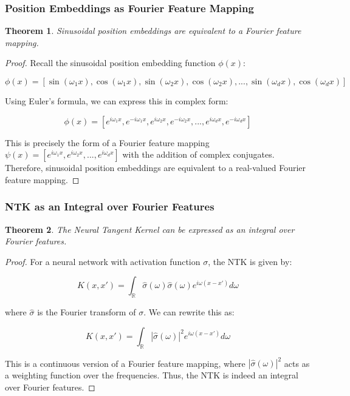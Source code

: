 \documentclass{article}
\newtheorem{theorem}{Theorem}
\begin{document}
\subsubsection{Position Embeddings as Fourier Feature Mapping}

\begin{theorem}
Sinusoidal position embeddings are equivalent to a Fourier feature mapping.
\end{theorem}

\begin{proof}
Recall the sinusoidal position embedding function $\phi(x)$:

\begin{equation}
    \phi(x) = [\sin(\omega_1 x), \cos(\omega_1 x), \sin(\omega_2 x), \cos(\omega_2 x), ..., \sin(\omega_d x), \cos(\omega_d x)]
\end{equation}

Using Euler's formula, we can express this in complex form:

\begin{equation}
    \phi(x) = [e^{i\omega_1 x}, e^{-i\omega_1 x}, e^{i\omega_2 x}, e^{-i\omega_2 x}, ..., e^{i\omega_d x}, e^{-i\omega_d x}]
\end{equation}

This is precisely the form of a Fourier feature mapping $\psi(x) = [e^{i\omega_1 x}, e^{i\omega_2 x}, ..., e^{i\omega_d x}]$ with the addition of complex conjugates. Therefore, sinusoidal position embeddings are equivalent to a real-valued Fourier feature mapping.
\end{proof}

\subsubsection{NTK as an Integral over Fourier Features}

\begin{theorem}
The Neural Tangent Kernel can be expressed as an integral over Fourier features.
\end{theorem}

\begin{proof}
For a neural network with activation function $\sigma$, the NTK is given by:

\begin{equation}
    K(x, x') = \int_{\mathbb{R}} \hat{\sigma}(\omega) \hat{\sigma}(\omega) e^{i\omega(x-x')} d\omega
\end{equation}

where $\hat{\sigma}$ is the Fourier transform of $\sigma$. We can rewrite this as:

\begin{equation}
    K(x, x') = \int_{\mathbb{R}} |\hat{\sigma}(\omega)|^2 e^{i\omega(x-x')} d\omega
\end{equation}

This is a continuous version of a Fourier feature mapping, where $|\hat{\sigma}(\omega)|^2$ acts as a weighting function over the frequencies. Thus, the NTK is indeed an integral over Fourier features.
\end{proof}
\end{document}
